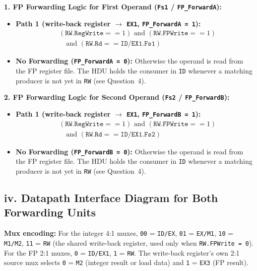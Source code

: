 \documentclass[11pt, a4paper]{article}
\begin{document}
\textbf{1. FP Forwarding Logic for First Operand (\texttt{Fs1} / \texttt{FP\_ForwardA}):}
\begin{itemize}[noitemsep, topsep=2pt]
    \item \textbf{Path 1 (write-back register $\rightarrow$ \texttt{EX1}, \texttt{FP\_ForwardA = 1}):}
    \[
    \begin{aligned}
        &(\texttt{RW.RegWrite} == 1) \text{ and } (\texttt{RW.FPWrite} == 1) \\
        &\quad \text{and } (\texttt{RW.Rd} == \texttt{ID/EX1.Fs1})
    \end{aligned}
    \]
    \item \textbf{No Forwarding (\texttt{FP\_ForwardA = 0}):} Otherwise the operand is read from the FP register file. The HDU holds the consumer in \texttt{ID} whenever a matching producer is not yet in \texttt{RW} (see Question~4).
\end{itemize}

\textbf{2. FP Forwarding Logic for Second Operand (\texttt{Fs2} / \texttt{FP\_ForwardB}):}
\begin{itemize}[noitemsep, topsep=2pt]
    \item \textbf{Path 1 (write-back register $\rightarrow$ \texttt{EX1}, \texttt{FP\_ForwardB = 1}):}
    \[
    \begin{aligned}
        &(\texttt{RW.RegWrite} == 1) \text{ and } (\texttt{RW.FPWrite} == 1) \\
        &\quad \text{and } (\texttt{RW.Rd} == \texttt{ID/EX1.Fs2})
    \end{aligned}
    \]
    \item \textbf{No Forwarding (\texttt{FP\_ForwardB = 0}):} Otherwise the operand is read from the FP register file. The HDU holds the consumer in \texttt{ID} whenever a matching producer is not yet in \texttt{RW} (see Question~4).
\end{itemize}

\vspace{8pt}
\subsection*{iv. Datapath Interface Diagram for Both Forwarding Units}


\textbf{Mux encoding:} For the integer 4:1 muxes, \texttt{00} = \texttt{ID/EX}, \texttt{01} = \texttt{EX/M1}, \texttt{10} = \texttt{M1/M2}, \texttt{11} = \texttt{RW} (the shared write-back register, used only when \texttt{RW.FPWrite = 0}). For the FP 2:1 muxes, \texttt{0} = \texttt{ID/EX1}, \texttt{1} = \texttt{RW}. The write-back register's own 2:1 source mux selects \texttt{0} = \texttt{M2} (integer result or load data) and \texttt{1} = \texttt{EX3} (FP result).
\end{document}
